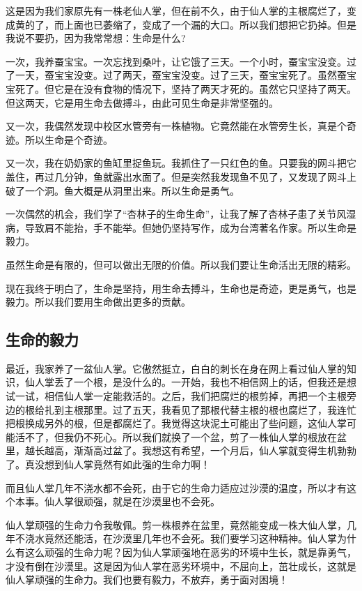 \documentclass[UTF8,a4paper,titlepage,twoside,10.5pt]{article}
\begin{document}
这是因为我们家原先有一株老仙人掌，但在前不久，由于仙人掌的主根腐烂了，变成黄的了，而上面也已萎缩了，变成了一个漏的大口。所以我们想把它扔掉。但是我说不要扔，因为我常常想：生命是什么?

一次，我养蚕宝宝。一次忘找到桑叶，让它饿了三天。一个小时，蚕宝宝没变。过了一天，蚕宝宝没变。过了两天，蚕宝宝没变。过了三天，蚕宝宝死了。虽然蚕宝宝死了。但它是在没有食物的情况下，坚持了两天才死的。虽然它只坚持了两天。但这两天，它是用生命去做搏斗，由此可见生命是非常坚强的。

又一次，我偶然发现中校区水管旁有一株植物。它竟然能在水管旁生长，真是个奇迹。所以生命是个奇迹。

又一次，我在奶奶家的鱼缸里捉鱼玩。我抓住了一只红色的鱼。只要我的网斗把它盖住，再过几分钟，鱼就露出水面了。但是突然我发现鱼不见了，又发现了网斗上破了一个洞。鱼大概是从洞里出来。所以生命是勇气。

一次偶然的机会，我们学了“杏林子的生命生命”，让我了解了杏林子患了关节风湿病，导致肩不能抬，手不能举。但她仍坚持写作，成为台湾著名作家。所以生命是毅力。

虽然生命是有限的，但可以做出无限的价值。所以我们要让生命活出无限的精彩。

现在我终于明白了，生命是坚持，用生命去搏斗，生命也是奇迹，更是勇气，也是毅力。所以我们要用生命做出更多的贡献。

\subsection{生命的毅力}
\label{sec:orgf6fa17d}

最近，我家养了一盆仙人掌。它傲然挺立，白白的刺长在身在网上看过仙人掌的知识，仙人掌丢了一个根，是没什么的。一开始，我也不相信网上的话，但我还是想试一试，相信仙人掌一定能救活的。之后，我们把腐烂的根剪掉，再把一个主根旁边的根给扎到主根那里。过了五天，我看见了那根代替主根的根也腐烂了，我连忙把根换成另外的根，但是都腐烂了。我觉得这块泥土可能出了些问题，这仙人掌可能活不了，但我仍不死心。所以我们就换了一个盆，剪了一株仙人掌的根放在盆里，越长越高，渐渐高过盆了。我想这有希望，一个月后，仙人掌就变得生机勃勃了。真没想到仙人掌竟然有如此强的生命力啊！

而且仙人掌几年不浇水都不会死，由于它的生命力适应过沙漠的温度，所以才有这个本事。仙人掌很顽强，就是在沙漠里也不会死。

仙人掌顽强的生命力令我敬佩。剪一株根养在盆里，竟然能变成一株大仙人掌，几年不浇水竟然还能活，在沙漠里几年也不会死。我们要学习这种精神。仙人掌为什么有这么顽强的生命力呢？因为仙人掌顽强地在恶劣的环境中生长，就是靠勇气，才没有倒在沙漠里。这是因为仙人掌在恶劣环境中，不屈向上，茁壮成长，这就是仙人掌顽强的生命力。我们也要有毅力，不放弃，勇于面对困境！
\end{document}
